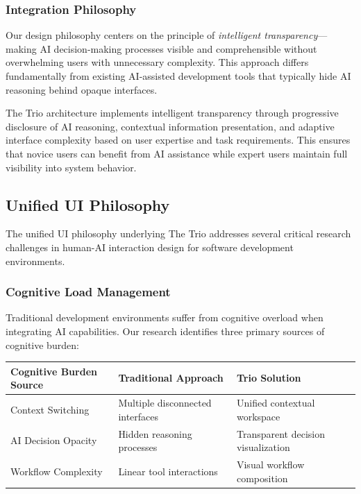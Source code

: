 \subsubsection*{Integration Philosophy}

Our design philosophy centers on the principle of \textit{intelligent transparency}—making AI decision-making processes visible and comprehensible without overwhelming users with unnecessary complexity. This approach differs fundamentally from existing AI-assisted development tools that typically hide AI reasoning behind opaque interfaces.

\begin{infobox}[title=Design Philosophy: Intelligent Transparency]
The Trio architecture implements intelligent transparency through progressive disclosure of AI reasoning, contextual information presentation, and adaptive interface complexity based on user expertise and task requirements. This ensures that novice users can benefit from AI assistance while expert users maintain full visibility into system behavior.
\end{infobox}

\subsection*{Unified UI Philosophy}

The unified UI philosophy underlying The Trio addresses several critical research challenges in human-AI interaction design for software development environments.

\subsubsection*{Cognitive Load Management}

Traditional development environments suffer from cognitive overload when integrating AI capabilities. Our research identifies three primary sources of cognitive burden:

\begin{center}
\begin{tabular}{@{}lll@{}}
\toprule
\textbf{Cognitive Burden Source} & \textbf{Traditional Approach} & \textbf{Trio Solution} \\
\midrule
Context Switching & Multiple disconnected interfaces & Unified contextual workspace \\
AI Decision Opacity & Hidden reasoning processes & Transparent decision visualization \\
Workflow Complexity & Linear tool interactions & Visual workflow composition \\
\bottomrule
\end{tabular}
\end{center}

